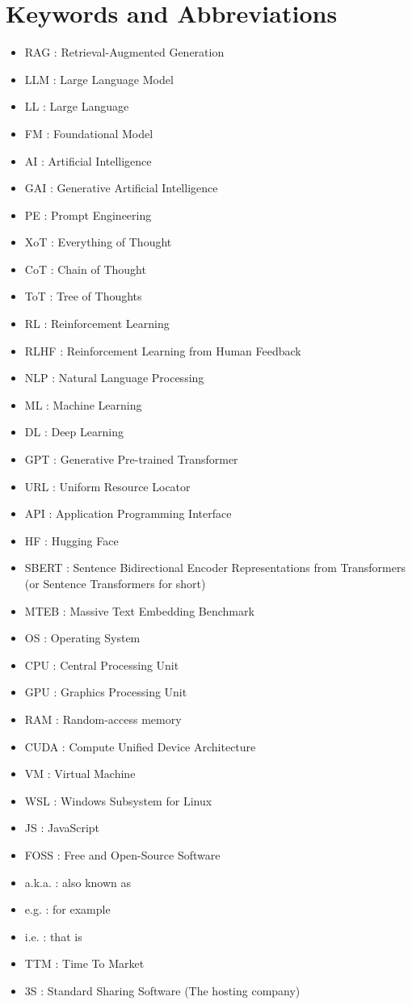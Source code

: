 \chapter*{Keywords and Abbreviations}
\begin{itemize}
    \item RAG : Retrieval-Augmented Generation
    \item LLM : Large Language Model
    \item LL : Large Language
    \item FM : Foundational Model
    \item AI : Artificial Intelligence
    \item GAI : Generative Artificial Intelligence
    \item PE : Prompt Engineering
    \item XoT : Everything of Thought
    \item CoT : Chain of Thought
    \item ToT : Tree of Thoughts
    \item RL : Reinforcement Learning
    \item RLHF : Reinforcement Learning from Human Feedback
    \item NLP : Natural Language Processing
    \item ML : Machine Learning
    \item DL : Deep Learning
    \item GPT : Generative Pre-trained Transformer
    \item URL : Uniform Resource Locator
    \item API : Application Programming Interface
    \item HF : Hugging Face
    \item SBERT : Sentence Bidirectional Encoder Representations from Transformers (or Sentence Transformers for short)
    \item MTEB : Massive Text Embedding Benchmark
    \item OS : Operating System
    \item CPU : Central Processing Unit
    \item GPU : Graphics Processing Unit
    \item RAM : Random-access memory
    \item CUDA : Compute Unified Device Architecture
    \item VM : Virtual Machine
    \item WSL : Windows Subsystem for Linux
    \item JS : JavaScript
    \item FOSS : Free and Open-Source Software
    \item a.k.a. : also known as
    \item e.g. : for example
    \item i.e. : that is
    \item TTM : Time To Market
    \item 3S : Standard Sharing Software (The hosting company)
\end{itemize}